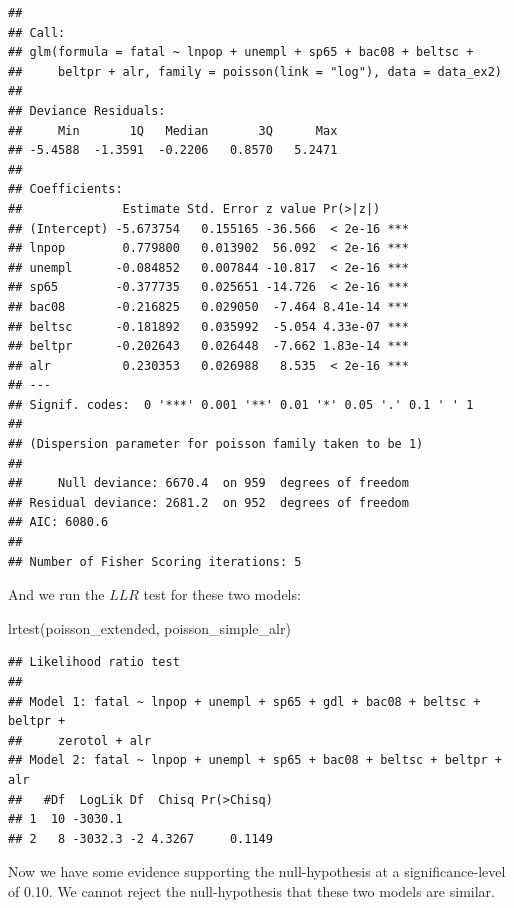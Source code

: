 \documentclass[
]{article}
\newenvironment{Shaded}{\begin{snugshade}}{\end{snugshade}}
\newcommand{\FunctionTok}[1]{\textcolor[rgb]{0.00,0.00,0.00}{#1}}
\newcommand{\NormalTok}[1]{#1}
\begin{document}
\begin{verbatim}
## 
## Call:
## glm(formula = fatal ~ lnpop + unempl + sp65 + bac08 + beltsc + 
##     beltpr + alr, family = poisson(link = "log"), data = data_ex2)
## 
## Deviance Residuals: 
##     Min       1Q   Median       3Q      Max  
## -5.4588  -1.3591  -0.2206   0.8570   5.2471  
## 
## Coefficients:
##              Estimate Std. Error z value Pr(>|z|)    
## (Intercept) -5.673754   0.155165 -36.566  < 2e-16 ***
## lnpop        0.779800   0.013902  56.092  < 2e-16 ***
## unempl      -0.084852   0.007844 -10.817  < 2e-16 ***
## sp65        -0.377735   0.025651 -14.726  < 2e-16 ***
## bac08       -0.216825   0.029050  -7.464 8.41e-14 ***
## beltsc      -0.181892   0.035992  -5.054 4.33e-07 ***
## beltpr      -0.202643   0.026448  -7.662 1.83e-14 ***
## alr          0.230353   0.026988   8.535  < 2e-16 ***
## ---
## Signif. codes:  0 '***' 0.001 '**' 0.01 '*' 0.05 '.' 0.1 ' ' 1
## 
## (Dispersion parameter for poisson family taken to be 1)
## 
##     Null deviance: 6670.4  on 959  degrees of freedom
## Residual deviance: 2681.2  on 952  degrees of freedom
## AIC: 6080.6
## 
## Number of Fisher Scoring iterations: 5
\end{verbatim}

And we run the \(LLR\) test for these two models:

\begin{Shaded}
\begin{Highlighting}[]
\FunctionTok{lrtest}\NormalTok{(poisson\_extended, poisson\_simple\_alr)}
\end{Highlighting}
\end{Shaded}

\begin{verbatim}
## Likelihood ratio test
## 
## Model 1: fatal ~ lnpop + unempl + sp65 + gdl + bac08 + beltsc + beltpr + 
##     zerotol + alr
## Model 2: fatal ~ lnpop + unempl + sp65 + bac08 + beltsc + beltpr + alr
##   #Df  LogLik Df  Chisq Pr(>Chisq)
## 1  10 -3030.1                     
## 2   8 -3032.3 -2 4.3267     0.1149
\end{verbatim}

Now we have some evidence supporting the null-hypothesis at a
significance-level of 0.10. We cannot reject the null-hypothesis that
these two models are similar.
\end{document}
